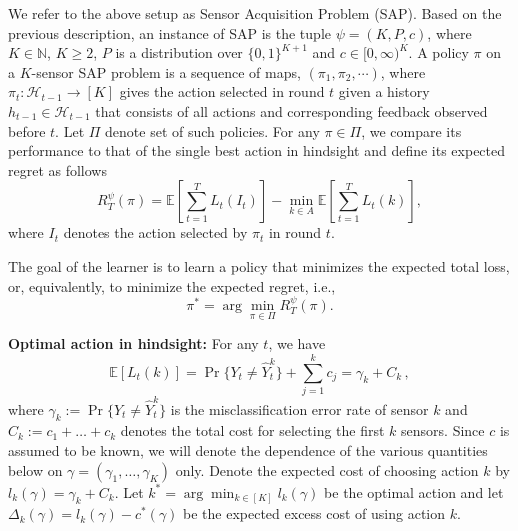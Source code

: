 We refer to the above setup as Sensor Acquisition Problem (SAP).
Based on the previous description, an instance of SAP is the tuple $\psi = (K,P,c)$, where $K\in \mathbb{N}$, $K\ge 2$,
$P$ is a distribution over $\{0,1\}^{K+1}$ and $c\in [0,\infty)^K$. 
 A policy $\pi$ on a $K$-sensor SAP problem
 is a sequence of maps, $(\pi_1, \pi_2, \cdots)$, where
 $\pi_t : \mathcal{H}_{t-1}\rightarrow [K]$ gives the action selected in round $t$
 given a history $h_{t-1}\in \mathcal{H}_{t-1}$ that consists of all actions and corresponding feedback observed before $t$. 
 Let $\Pi$ denote set of such policies. 
 For any $\pi \in \Pi$, we compare its performance to that of the single best action in hindsight 
 and define its expected regret as follows
\begin{equation}
R^\psi_T(\pi)= \mathbb{E}\left[\sum_{t=1}^T L_t(I_t)\right]-\min_{k\in A}\mathbb{E}\left[\sum_{t=1}^T L_t(k)\right],
\end{equation}
where $I_t$ denotes the action selected by $\pi_t$ in round $t$.

The goal of the learner is to learn a policy that minimizes the expected total loss, or, equivalently, to minimize the expected regret, i.e.,
\begin{equation}
\pi^*= \arg \min_{\pi \in \Pi } R^\psi_T(\pi).
\end{equation}

\noindent
{\bf Optimal action in hindsight: } For any $t$, we have 
\begin{equation}
\label{eqn:OptimalAction}
\mathbb{E}[L_t(k)]=\Pr\{Y_t\neq \hat{Y}^k_t\}+\sum_{j=1}^kc_j=\gamma_k +C_k\,,
\end{equation}
where $\gamma_k:=\Pr\{Y_t\neq \hat{Y}^k_t\}$ is the misclassification error rate of sensor $k$ and $C_k := c_1+\dots+c_k$ denotes the total cost for selecting the first $k$ sensors.
Since $c$ is assumed to be known, we will denote the dependence of the various quantities below
on $\gamma = (\gamma_1,\dots,\gamma_K)$ only.
Denote the expected cost of choosing action $k$ by $l_k(\gamma) = \gamma_k + C_k$. Let $k^* = \arg\min_{k\in [K]} l_k(\gamma)$ be the optimal action and let 
$\Delta_k(\gamma) = l_k(\gamma) - c^*(\gamma)$ be the expected excess cost of using action $k$.

